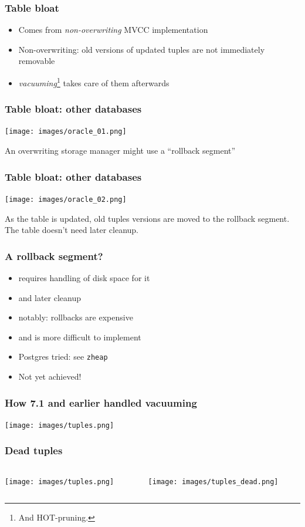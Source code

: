 \begin{frame}
  \frametitle{Table bloat}
  \begin{itemize}
    \item Comes from \emph{non-overwriting} MVCC implementation
    \item Non-overwriting: old versions of updated tuples are not immediately removable
    \item \emph{vacuuming}\footnote{And HOT-pruning.} takes care of them afterwards
  \end{itemize}
\end{frame}

\begin{frame}
  \frametitle{Table bloat: other databases}
  \texttt{[image: images/oracle\_01.png]}

  An overwriting storage manager might use a ``rollback segment''
\end{frame}

\begin{frame}
  \frametitle{Table bloat: other databases}
  \texttt{[image: images/oracle\_02.png]}

  As the table is updated, old tuples versions are moved to the rollback segment. The table doesn't need later cleanup.
\end{frame}

\begin{frame}
  \frametitle{A rollback segment?}
  \begin{itemize}
    \item requires handling of disk space for it
    \item and later cleanup
    \item notably: rollbacks are expensive
    \item<2> and is more difficult to implement
    \item<2> Postgres tried: see \texttt{zheap}
    \item<2> Not yet achieved!
  \end{itemize}
\end{frame}

\begin{frame}
  \frametitle{How 7.1 and earlier handled vacuuming}
  \texttt{[image: images/tuples.png]}
\end{frame}

\begin{frame}
  \frametitle{Dead tuples}
  \begin{columns}
    \begin{column}{0.5\textwidth}
      \texttt{[image: images/tuples.png]}
    \end{column}
    \begin{column}{0.5\textwidth}
      \texttt{[image: images/tuples\_dead.png]}
    \end{column}
  \end{columns}
\end{frame}

